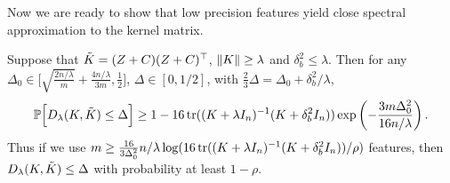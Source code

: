 Now we are ready to show that low precision features yield close spectral
approximation to the kernel matrix.

\begin{theorem}
  Suppose that $\tilde{K} = (Z+C)(Z+C)^\top$, $\|K\| \geq \lambda$ and $\delta^2_b \leq \lambda$.
  Then for any $\Delta_0 \in \Big[\sqrt{\frac{2n/\lambda}{m}} + \frac{4n/\lambda}{3m}, \frac{1}{2}\Big]$, $\Delta \in [0,1/2]$, with $\frac{2}{3}\Delta = \Delta_0 + \delta^2_b / \lambda$,
  \begin{equation*}
    \mathbb{P}\Big[D_{\lambda}(K,\tilde{K}) \leq \Delta\Big] \geq 1 - 16 \mathop{\rm tr}((K +
    \lambda I_n)^{-1} (K + \delta^2_b I_n)) \exp \left( -\frac{3m \Delta_0^2}{16n/\lambda} \right).
  \end{equation*}
  Thus if we use $m \geq \frac{16}{3 \Delta_0^2} n/\lambda \log (16 \mathop{\rm tr}((K + \lambda I_n)^{-1} (K +
  \delta^2_b I_n)) / \rho)$
  features, then $D_\lambda(K,\tilde{K})\leq \Delta$  with probability at least $1 - \rho$.
\end{theorem}

